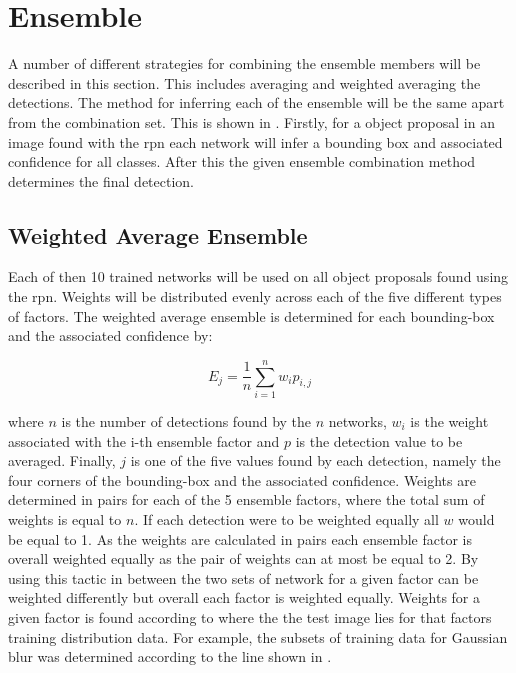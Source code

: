 \section{Ensemble}
A number of different strategies for combining the ensemble members will be described in this section. This includes averaging and weighted averaging the detections. The method for inferring each of the ensemble will be the same apart from the combination set. This is shown in . Firstly, for a object proposal in an image found with the \gls{rpn} each network will infer a bounding box and associated confidence for all classes. After this the given ensemble combination method determines the final detection. 

\subsection{Weighted Average Ensemble}
Each of then 10 trained networks will be used on all object proposals found using the \gls{rpn}. Weights will be distributed evenly across each of the five different types of factors. The weighted average ensemble is determined for each bounding-box and the associated confidence by:

\begin{equation}
	E_{j} = \frac{1}{n} \sum_{i=1}^{n} w_ip_{i,j} 
\end{equation}

where $n$ is the number of detections found by the $n$ networks, $w_i$ is the weight associated with the i-th ensemble factor and $p$ is the detection value to be averaged. Finally, $j$ is one of the five values found by each detection, namely the four corners of the bounding-box and the associated confidence.
Weights are determined in pairs for each of the 5 ensemble factors, where the total sum of weights is equal to $n$. If each detection were to be weighted equally all $w$ would be equal to 1. As the weights are calculated in pairs each ensemble factor is overall weighted equally as the pair of weights can at most be equal to 2. By using this tactic in between the two sets of network for a given factor can be weighted differently but overall each factor is weighted equally.
Weights for a given factor is found according to where the the test image lies for that factors training distribution data. For example, the subsets of training data for Gaussian blur was determined according to the line shown in . 


